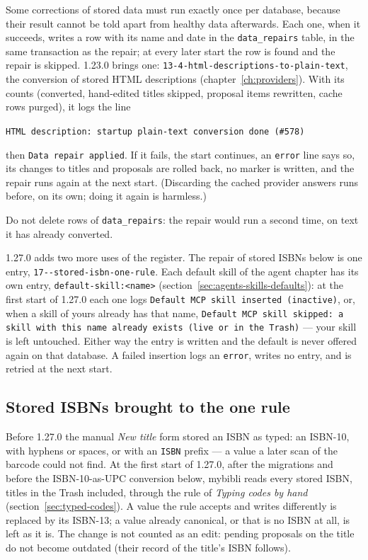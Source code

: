 Some corrections of stored data must run exactly once per database,
because their result cannot be told apart from healthy data afterwards.
Each one, when it succeeds, writes a row with its name and date in the
\texttt{data\_repairs} table, in the same
transaction as the repair; at every later start the row is found and
the repair is skipped. 1.23.0 brings one:
\texttt{13-4-html-\allowbreak descriptions-\allowbreak to-\allowbreak plain-\allowbreak text}, the conversion of
stored HTML descriptions (chapter~\ref{ch:providers}). With its
counts (converted, hand-edited titles skipped, proposal items
rewritten, cache rows purged), it logs the line

\texttt{HTML description: startup plain-text conversion done (\#578)}

\noindent then \texttt{Data repair applied}. If it
fails, the start continues, an \texttt{error} line says so, its
changes to titles and proposals are rolled back, no marker is written,
and the repair runs again at the next start. (Discarding the cached
provider answers runs before, on its own; doing it again is harmless.)

\begin{warning}
Do not delete rows of \texttt{data\_repairs}: the repair would run a
second time, on text it has already converted.
\end{warning}

1.27.0 adds two more uses of the register. The repair of stored ISBNs
below is one entry,
\texttt{17--\allowbreak stored-\allowbreak isbn-\allowbreak one-\allowbreak rule}.
Each default skill of the agent chapter has its own entry,
\texttt{default-skill:\allowbreak <name>} (section~\ref{sec:agents-skills-defaults}):
at the first start of 1.27.0 each one logs \texttt{Default MCP skill
inserted (inactive)}, or, when a skill of yours already has that name,
\texttt{Default MCP skill skipped: a skill with this name already exists
(live or in the Trash)} --- your skill is left untouched. Either way the
entry is written and the default is never offered again on that
database. A failed insertion logs an \texttt{error}, writes no entry,
and is retried at the next start.

\subsection*{Stored ISBNs brought to the one rule}

Before 1.27.0 the manual \emph{New title} form stored an ISBN as typed:
an ISBN-10, with hyphens or spaces, or with an \texttt{ISBN} prefix ---
a value a later scan of the barcode could not find. At the first start
of 1.27.0, after the migrations and before the ISBN-10-as-UPC
conversion below, mybibli reads every stored ISBN, titles in the Trash
included, through the rule of \emph{Typing codes by hand}
(section~\ref{sec:typed-codes}). A value the
rule accepts and writes differently is replaced by its ISBN-13; a value
already canonical, or that is no ISBN at all, is left as it is. The
change is not counted as an edit: pending proposals on the title do
not become outdated (their record of the title's ISBN follows).

